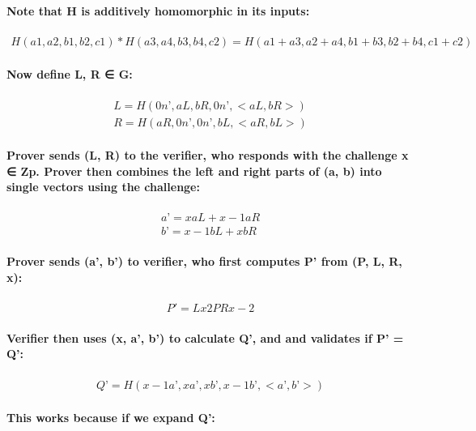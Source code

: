 \documentclass{article}
\begin{document}
\paragraph{Note that H is additively homomorphic in its inputs:}

\begin{eqnarray}
  H(a1, a2, b1, b2, c1)*H(a3, a4, b3, b4, c2) = H(a1 + a3, a2 + a4, b1 + b3, b2 + b4, c1+c2)
\end{eqnarray}

\paragraph{Now define L, R ∈ G:}

\begin{eqnarray}
  L = H(0n’, aL, bR, 0n’, <aL, bR>)\\
  R = H(aR, 0n’, 0n’, bL, <aR, bL>)
\end{eqnarray}

\paragraph{Prover sends (L, R) to the verifier, who responds with the challenge x ∈ Zp.  Prover then combines the left and right parts of (a, b) into single vectors using the challenge:}

\begin{eqnarray}
  a’ = x aL + x-1 aR\\
  b’ = x-1 bL + x bR
\end{eqnarray}

\paragraph{Prover sends (a’, b’) to verifier, who first computes P' from (P, L, R, x):}

\begin{eqnarray}
  P'=Lx2PRx-2
\end{eqnarray}

\paragraph{Verifier then uses (x, a’, b’) to calculate Q’, and and validates if P’ = Q’: }

\begin{eqnarray}
  Q’ = H(x-1 a’, x a’, x b’, x-1 b’, <a’, b’>)
\end{eqnarray}

\paragraph{This works because if we expand Q’:}
\end{document}
